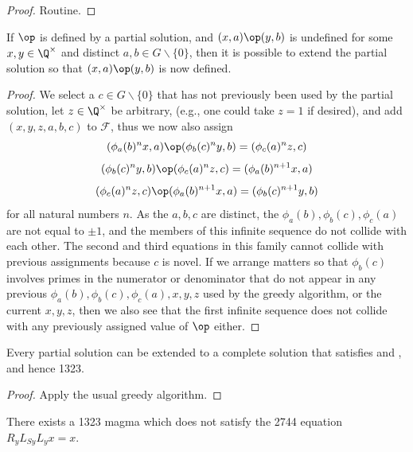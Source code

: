 \begin{proof} Routine.
\end{proof}

\begin{lemma}\label{greedy-1323}\leanok{}  If $\op$ is defined by a partial solution, and $(x,a) \op (y,b)$ is undefined for some $x,y \in \Q^\times$ and distinct $a,b \in G \backslash \{0\}$, then it is possible to extend the partial solution so that $(x,a) \op (y,b)$ is now defined.
\end{lemma}

\begin{proof} We select a $c \in G \backslash \{0\}$ that has not previously been used by the partial solution, let $z \in \Q^\times$ be arbitrary, (e.g., one could take $z=1$ if desired), and add $(x,y,z,a,b,c)$ to ${\mathcal F}$, thus we now also assign
$$ (\phi_a(b)^n x,a) \op (\phi_b(c)^n y,b) = (\phi_c(a)^n z,c)$$
$$ (\phi_b(c)^n y,b) \op (\phi_c(a)^n z,c) = (\phi_a(b)^{n+1} x, a)$$
$$ (\phi_c(a)^n z,c) \op (\phi_a(b)^{n+1} x, a) = (\phi_b(c)^{n+1} y,b)$$
for all natural numbers $n$.  As the $a,b,c$ are distinct, the $\phi_a(b), \phi_b(c), \phi_c(a)$ are not equal to $\pm 1$, and the members of this infinite sequence do not collide with each other.  The second and third equations in this family cannot collide with previous assignments because $c$ is novel.  If we arrange matters so that $\phi_b(c)$ involves primes in the numerator or denominator that do not appear in any previous $\phi_a(b), \phi_b(c), \phi_c(a), x, y, z$ used by the greedy algorithm, or the current $x,y,z$, then we also see that the first infinite sequence does not collide with any previously assigned value of $\op$ either.
\end{proof}

\begin{corollary}\label{greedy-iterate}\leanok{}  Every partial solution can be extended to a complete solution that satisfies  and , and hence 1323.
\end{corollary}

\begin{proof} Apply the usual greedy algorithm.
\end{proof}

\begin{corollary}\label{1323-refute-2744}\leanok{}  There exists a 1323 magma which does not satisfy the 2744 equation $R_y L_{Sy} L_y x = x$.
\end{corollary}

